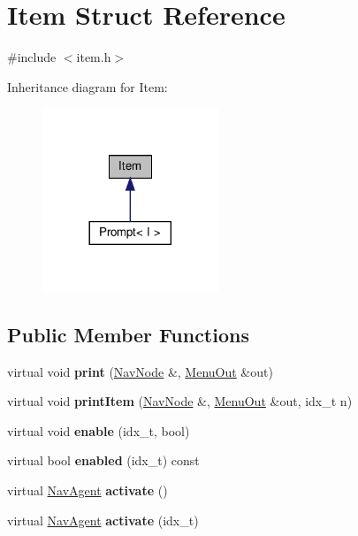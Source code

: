 \hypertarget{structItem}{}\section{Item Struct Reference}
\label{structItem}


{\ttfamily \#include $<$item.\+h$>$}



Inheritance diagram for Item\+:\nopagebreak
\begin{figure}[H]
\begin{center}
\leavevmode
\includegraphics[width=149pt]{structItem__inherit__graph}
\end{center}
\end{figure}
\subsection*{Public Member Functions}
\begin{DoxyCompactItemize}
\item 
\mbox{\label{structItem_a48e23000fb91838772b9c9bebbd78497}} 
virtual void {\bfseries print} (\hyperlink{structNavNode}{Nav\+Node} \&, \hyperlink{structMenuOut}{Menu\+Out} \&out)
\item 
\mbox{\label{structItem_a6efc4b4278477e89420279d4cfc480b3}} 
virtual void {\bfseries print\+Item} (\hyperlink{structNavNode}{Nav\+Node} \&, \hyperlink{structMenuOut}{Menu\+Out} \&out, idx\+\_\+t n)
\item 
\mbox{\label{structItem_a8f540c337986f0ad492f6916c0ed9983}} 
virtual void {\bfseries enable} (idx\+\_\+t, bool)
\item 
\mbox{\label{structItem_abccd7d2f634cb3c01bdd5941da28d7fc}} 
virtual bool {\bfseries enabled} (idx\+\_\+t) const
\item 
\mbox{\label{structItem_a0743ced8954d242f4216a3d1f54621d5}} 
virtual \hyperlink{structNavAgent}{Nav\+Agent} {\bfseries activate} ()
\item 
\mbox{\label{structItem_a3932349db1217f9612407a31ee169f85}} 
virtual \hyperlink{structNavAgent}{Nav\+Agent} {\bfseries activate} (idx\+\_\+t)
\end{DoxyCompactItemize}


